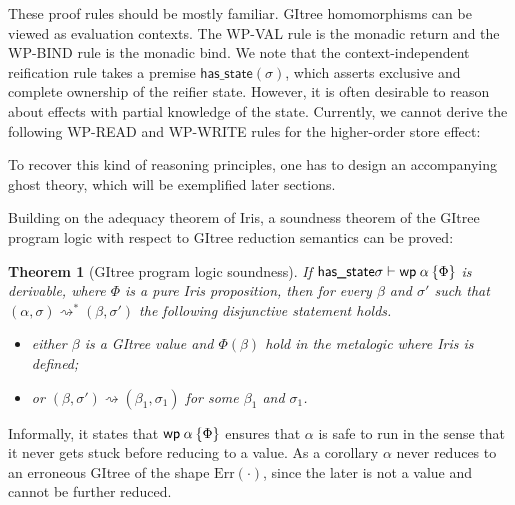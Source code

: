\documentclass{article}
\theoremstyle{definition}
\theoremstyle{plain}
\newtheorem{theorem}{Theorem}[section]
\theoremstyle{remark}
\newcommand{\Redu}{\rightsquigarrow}
\newcommand{\Redus}{\Redu^\ast}
\newcommand{\hasstate}{\textsf{has\_state}}
\newcommand{\gRet}{\mathrm{Ret}}
\newcommand{\gErr}{\mathrm{Err}}
\begin{document}
These proof rules should be mostly familiar. GItree homomorphisms can be viewed as evaluation contexts. The \textsf{WP-VAL} rule is the monadic return and the \textsf{WP-BIND} rule is the monadic bind.
We note that the context-independent reification rule takes a premise \(\hasstate(\sigma)\), which asserts exclusive and complete ownership of the reifier state.
However, it is often desirable to reason about effects with partial knowledge of the state.
Currently, we cannot derive the following \textsf{WP-READ} and \textsf{WP-WRITE} rules for the higher-order store effect:


To recover this kind of reasoning principles, one has to design an accompanying ghost theory, which will be exemplified later sections.\par

Building on the adequacy theorem of Iris, a soundness theorem of the GItree program logic with respect to GItree reduction semantics can be proved:

\begin{theorem}[GItree program logic soundness]
  If \(\hasstate{\sigma}\proves\wpre{\alpha}{\Phi}\) is derivable, where \(\Phi\) is a pure Iris proposition, then for every \(\beta\) and \(\sigma'\) such that \((\alpha,\sigma)\Redus(\beta,\sigma')\) the following disjunctive statement holds.
 
  \begin{itemize}
    \item either \(\beta\) is a GItree value and \(\Phi(\beta)\) hold in the metalogic where Iris is defined;
    \item or \((\beta,\sigma')\Redu(\beta_1,\sigma_1)\) for some \(\beta_1\) and \(\sigma_1\).
  \end{itemize}
\end{theorem}

Informally, it states that \(\wpre{\alpha}{\Phi}\) ensures that \(\alpha\) is safe to run in the sense that it never gets stuck before reducing to a value. As a corollary \(\alpha\) never reduces to an erroneous GItree of the shape \(\gErr(\cdot)\), since the later is not a value and cannot be further reduced.
\end{document}

